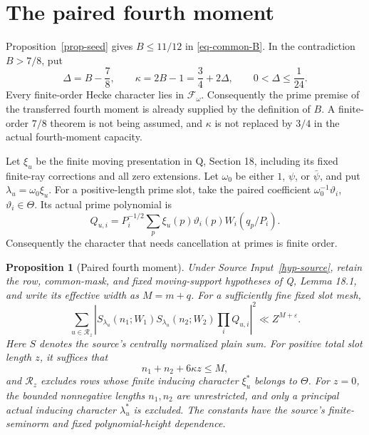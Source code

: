 \documentclass[11pt,a4paper]{article}
\newtheorem{proposition}[theorem]{Proposition}
\theoremstyle{remark}\newtheorem{remark}[theorem]{Remark}
\newcommand{\eps}{\varepsilon}
\newcommand{\Packet}{\mathscr F_\omega}
\numberwithin{equation}{section}
\begin{document}
\section{The paired fourth moment}\label{sec-fourth}

Proposition~\ref{prop-seed} gives $B\le11/12$ in
\eqref{eq-common-B}. In the contradiction $B>7/8$, put
\begin{equation}\label{eq-kappa}
 \Delta=B-\frac78,\qquad
 \kappa=2B-1=\frac34+2\Delta,\qquad
 0<\Delta\le\frac1{24}.
\end{equation}
Every finite-order Hecke character lies in $\Packet$.
Consequently the prime premise of the transferred fourth moment is already supplied
by the definition of $B$. A finite-order $7/8$ theorem is not
being assumed, and $\kappa$ is not replaced by $3/4$ in the
actual fourth-moment capacity.

Let $\xi_u$ be the finite moving presentation in Q, Section 18,
including its fixed finite-ray corrections and all zero extensions.
Let $\omega_0$ be either $1$, $\psi$, or $\bar\psi$, and put
$\lambda_u=\omega_0\xi_u$. For a positive-length prime slot,
take the paired coefficient $\omega_0^{-1}\vartheta_i$,
$\vartheta_i\in\Theta$. Its actual prime polynomial is
\begin{equation}\label{eq-paired}
 Q_{u,i}=P_i^{-1/2}\sum_p
       \xi_u(p)\vartheta_i(p)W_i(q_p/P_i).
\end{equation}
Consequently the character that needs cancellation at primes
is finite order.

\begin{proposition}[Paired fourth moment]\label{prop-fourth}
Under Source Input~\ref{hyp-source}, retain the row, common-mask, and fixed
moving-support hypotheses
of Q, Lemma 18.1, and write its effective width as $M=m+q$.
For a sufficiently fine fixed slot mesh,
\begin{equation}\label{eq-fourth}
 \sum_{u\in\mathcal R_z}
  |S_{\lambda_u}(n_1;W_1)S_{\lambda_u}(n_2;W_2)
                         \prod_iQ_{u,i}|^2
 \ll Z^{M+\eps}.
\end{equation}
Here $S$ denotes the source's centrally normalized plain sum.
For positive total slot length $z$, it suffices that
\[
 n_1+n_2+6\kappa z\le M,
\]
and $\mathcal R_z$ excludes rows whose finite inducing character
$\xi_u^*$ belongs to $\Theta$. For $z=0$, the bounded
nonnegative lengths $n_1,n_2$ are unrestricted, and only a
principal actual inducing character $\lambda_u^*$ is excluded.
The constants have the source's finite-seminorm and fixed
polynomial-height dependence.
\end{proposition}
\end{document}
